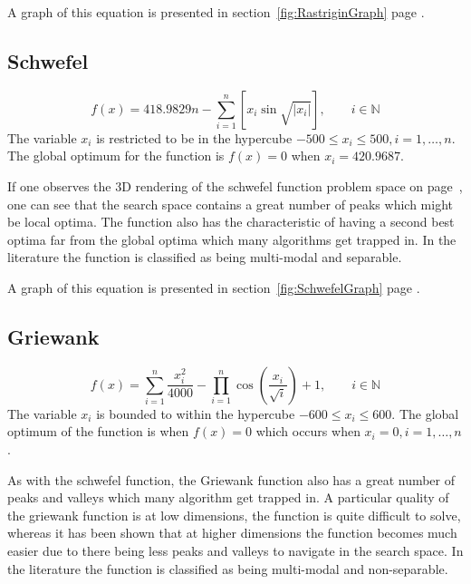A graph of this equation is presented in section~\ref{fig:RastriginGraph} page \pageref{fig:RastriginGraph}.
\subsection{Schwefel}
\begin{equation}
	f(x) = 418.9829n - \sum^n_{i=1} [x_i\sin{\sqrt{|x_i|}}], \qquad i \in \mathbb{N}
\end{equation}
The variable $x_i$ is restricted to be in the hypercube $-500 \leq x_i \leq 500, i = 1,\ldots,n$\cite{ABCCompareStudy,numericalABC,HybridIntelliGA,DistributedHierarchicalGA,TestFunctions}. The global optimum for the function is $f(x) = 0$ when $x_i = 420.9687$\cite{ABCCompareStudy,numericalABC,HybridIntelliGA,DistributedHierarchicalGA,TestFunctions}. 

If one observes the 3D rendering of the schwefel function problem space on page~\pageref{fig:SchwefelGraph}, one can see that the search space contains a great number of peaks which might be local optima. The function also has the characteristic of having a second best optima far from the global optima which many algorithms get trapped in\cite{ABCCompareStudy,numericalABC,HybridIntelliGA,DistributedHierarchicalGA,TestFunctions}. In the literature the function is classified as being multi-modal and separable\cite{ABCCompareStudy,numericalABC,HybridIntelliGA,TestFunctions}.

A graph of this equation is presented in section~\ref{fig:SchwefelGraph} page \pageref{fig:SchwefelGraph}.
\subsection{Griewank}
\begin{equation}
	f(x) = \sum^n_{i=1} \frac{x^2_i}{4000} - \prod^n_{i=1}\cos{(\frac{x_i}{\sqrt{i}})} + 1, \qquad i \in \mathbb{N}
\end{equation}
The variable $x_i$ is bounded to within the hypercube $ -600 \leq x_i \leq 600 $\cite{numericalABC,ABCCompareStudy,ARPSO,PerfABC,ContinACSTS,TestFunctions}. The global optimum of the function is when $f(x) =0$ which occurs when $ x_i = 0, i = 1, \dots, n $\cite{numericalABC,ABCCompareStudy,ARPSO,PerfABC,ContinACSTS,TestFunctions}.

As with the schwefel function, the Griewank function also has a great number of peaks and valleys which many algorithm get trapped in. A particular quality of the griewank function is at low dimensions, the function is quite difficult to solve, whereas it has been shown that at higher dimensions the function becomes much easier due to there being less peaks and valleys to navigate in the search space\cite{evalevoalgo,ABCCompareStudy,numericalABC,PerfABC,TestFunctions}. In the literature the function is classified as being multi-modal and non-separable\cite{adaptPSO,ABCCompareStudy,numericalABC,ChaoticABC,PerfABC,TestFunctions}.

